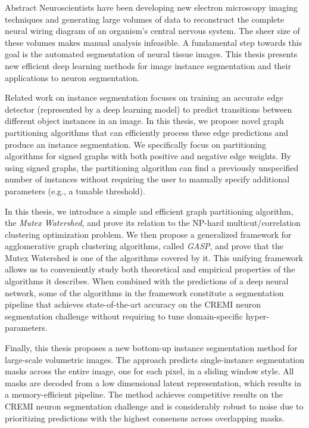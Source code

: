 
\begin{coverpage}{Abstract}
Neuroscientists have been developing new electron microscopy imaging techniques and generating large volumes of data to reconstruct the complete neural wiring diagram of an organism's central nervous system. The sheer size of these volumes makes manual analysis infeasible. A fundamental step towards this goal is the automated segmentation of neural tissue images. This thesis presents new efficient deep learning methods for image instance segmentation and their applications to neuron segmentation.

Related work on instance segmentation focuses on training an accurate edge detector (represented by  a deep learning model) to predict transitions between different object instances in an image. In this thesis, we propose novel graph partitioning algorithms that can efficiently process these edge predictions and produce an instance segmentation. We specifically focus on partitioning algorithms for signed graphs with both positive and negative edge weights. By using signed graphs, the partitioning algorithm can find a previously unspecified number of instances without requiring the user to manually specify additional parameters (e.g., a tunable threshold).

In this thesis, we introduce a simple and efficient graph partitioning algorithm, the \emph{Mutex Watershed}, and prove its relation to the NP-hard multicut/correlation clustering optimization problem. We then propose a generalized framework for agglomerative graph clustering algorithms, called \emph{GASP}, and prove that the Mutex Watershed is one of the algorithms covered by it. This unifying framework allows us to conveniently study both theoretical and empirical properties of the algorithms it describes. When combined with the predictions of a deep neural network, some of the algorithms in the framework constitute a segmentation pipeline that achieves state-of-the-art accuracy on the CREMI neuron segmentation challenge without requiring to tune domain-specific hyper-parameters.

Finally, this thesis proposes a new bottom-up instance segmentation method for large-scale volumetric images. The approach predicts single-instance segmentation masks across the entire image, one for each pixel, in a sliding window style. All masks are decoded from a low dimensional latent representation, which results in a memory-efficient pipeline. The method achieves competitive results on the CREMI neuron segmentation challenge and is considerably robust to noise due to  prioritizing predictions with the highest consensus across overlapping masks.

\end{coverpage}

